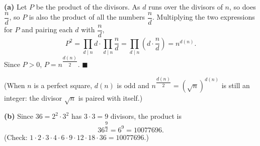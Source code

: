 \textbf{(a)} Let $P$ be the product of the divisors. As $d$ runs over the divisors of $n$, so does $\dfrac nd$, so $P$ is also the product of all the numbers $\dfrac nd$. Multiplying the two expressions for $P$ and pairing each $d$ with $\dfrac nd$,
\[P^2=\prod_{d\mid n}d\cdot\prod_{d\mid n}\dfrac nd=\prod_{d\mid n}\left(d\cdot\dfrac nd\right)=n^{d(n)}.\]
Since $P>0$, $P=n^{\dfrac{d(n)}{2}}$. $\blacksquare$

(When $n$ is a perfect square, $d(n)$ is odd and $n^{\dfrac{d(n)}{2}}=\left(\sqrt n\right)^{d(n)}$ is still an integer: the divisor $\sqrt n$ is paired with itself.)

\textbf{(b)} Since $36=2^2\cdot3^2$ has $3\cdot3=9$ divisors, the product is
\[36^{\dfrac92}=6^9=\boxed{10077696}.\]
(Check: $1\cdot2\cdot3\cdot4\cdot6\cdot9\cdot12\cdot18\cdot36=10077696$.)
